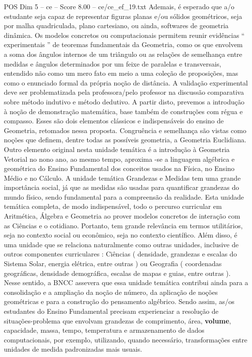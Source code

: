 \begin{textsample}{POS Dim 5 – ce – Score 8.00 – ce/ce\_ef\_19.txt}
Ademais, é esperado que a/o estudante seja capaz de representar figuras planas e/ou sólidos geométricos, seja por malha quadriculada, plano cartesiano, ou ainda, softwares de geometria dinâmica.
Os modelos concretos ou computacionais permitem reunir evidências “ experimentais ” de teoremas fundamentais da Geometria, como os que envolvem a soma dos ângulos internos de um triângulo ou as relações de semelhança entre medidas e ângulos determinados por um feixe de paralelas e transversais, entendido não como um mero fato em meio a uma coleção de proposições, mas como o enunciado formal da própria noção de distância.
A validação experimental deve ser problematizada pela professora/pelo professor na discussão comparativa sobre método indutivo e método dedutivo.
A partir disto, prevemos a introdução à noção de demonstração matemática, base também de construções com régua e compasso.
Esses são dois elementos clássicos e indispensáveis do ensino de Geometria, retomados nessa proposta.
Congruência e semelhança são vistas como noções que definem, dentre todas as possíveis geometria, a Geometria Euclidiana.
Outro elemento original nesta unidade temática é a introdução à Geometria Vetorial no nono ano, ao mesmo tempo, aproxima -se a linguagem algébrica e geométrica do Ensino Fundamental dos conceitos usados na Física, no Ensino Médio e no Cálculo.
A unidade temática Grandezas e Medidas tem uma grande importância social, já que as medidas são usadas para quantificar grandezas do mundo físico, sendo fundamental para a compreensão da realidade.
Esta unidade temática completa, de modo indispensável, todo o percurso curricular em Aritmética, Álgebra e Geometria ao prover modelos concretos de interação com as Ciências e o cotidiano.
Portanto, tem grande relevância em termos utilitários, seja no contexto social ou econômico, seja no contexto científico.
Além disso, é uma unidade que se relaciona naturalmente como outras unidades, inclusive de outros componentes curriculares : Ciências ( densidade, grandezas e escalas do Sistema Solar, energia elétrica, entre outras ) ou Geografia ( coordenadas geográficas, densidade demográfica, escalas de mapas e guias, entre outras ).
Nesse sentido, a BNCC assevera que essa unidade temática contribui ainda para a consolidação e a ampliação da noção de número, da aplicação de noções geométricas e para a construção do pensamento algébrico.
Sendo assim, as/os estudantes do Ensino Fundamental precisam experienciar a resolução de situações-problema que envolvam grandezas de comprimento, área, \textbf{volume}, capacidade, massa, tempo, temperatura e armazenamento de dados computacionais, por exemplo, utilizando, quando necessário, transformações entre unidades de medida padronizadas mais usuais.

\end{textsample}
